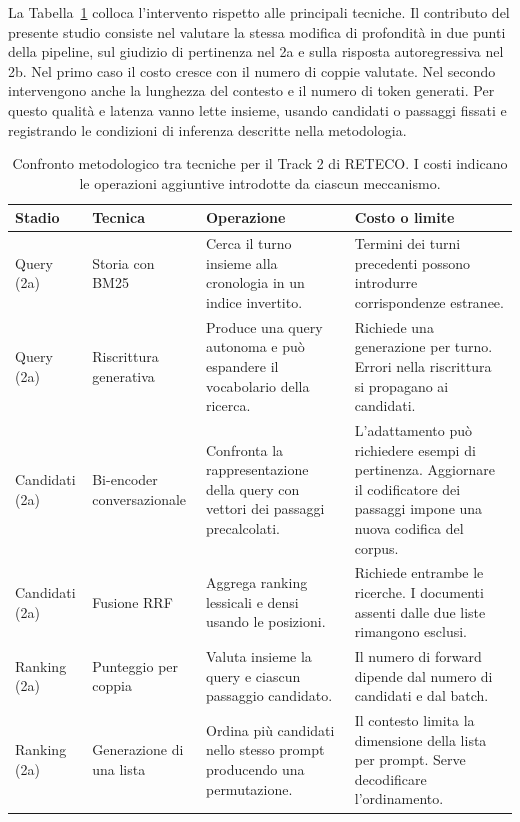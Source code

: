La Tabella~\ref{tab:related_techniques} colloca l'intervento rispetto alle principali tecniche. Il contributo del presente studio consiste nel valutare la stessa modifica di profondità in due punti della pipeline, sul giudizio di pertinenza nel 2a e sulla risposta autoregressiva nel 2b. Nel primo caso il costo cresce con il numero di coppie valutate. Nel secondo intervengono anche la lunghezza del contesto e il numero di token generati. Per questo qualità e latenza vanno lette insieme, usando candidati o passaggi fissati e registrando le condizioni di inferenza descritte nella metodologia.

\begin{table}[!htbp]
\centering
\small
\caption{Confronto metodologico tra tecniche per il Track 2 di RETECO. I costi indicano le operazioni aggiuntive introdotte da ciascun meccanismo.}
\label{tab:related_techniques}
\setlength{\tabcolsep}{4pt}
\renewcommand{\arraystretch}{1.24}
\begin{tabular}{@{}>{\raggedright\arraybackslash}p{.15\linewidth}>{\raggedright\arraybackslash}p{.21\linewidth}*{2}{>{\raggedright\arraybackslash}p{.28\linewidth}}@{}}
\toprule
\textbf{Stadio} & \textbf{Tecnica} & \textbf{Operazione} & \textbf{Costo o limite} \\
\midrule
Query (2a) & Storia con BM25 \cite{bm25,data} & Cerca il turno insieme alla cronologia in un indice invertito. & Termini dei turni precedenti possono introdurre corrispondenze estranee. \\
Query (2a) & Riscrittura generativa \cite{qrecc,convgqr,convsearchr1} & Produce una query autonoma e può espandere il vocabolario della ricerca. & Richiede una generazione per turno. Errori nella riscrittura si propagano ai candidati. \\
Candidati (2a) & Bi-encoder conversazionale \cite{convdr,haconvdr,qwen} & Confronta la rappresentazione della query con vettori dei passaggi precalcolati. & L'adattamento può richiedere esempi di pertinenza. Aggiornare il codificatore dei passaggi impone una nuova codifica del corpus. \\
Candidati (2a) & Fusione RRF \cite{rrf} & Aggrega ranking lessicali e densi usando le posizioni. & Richiede entrambe le ricerche. I documenti assenti dalle due liste rimangono esclusi. \\
Ranking (2a) & Punteggio per coppia \cite{qwen} & Valuta insieme la query e ciascun passaggio candidato. & Il numero di forward dipende dal numero di candidati e dal batch. \\
Ranking (2a) & Generazione di una lista \cite{rankgpt} & Ordina più candidati nello stesso prompt producendo una permutazione. & Il contesto limita la dimensione della lista per prompt. Serve decodificare l'ordinamento. \\

\end{tabular}
\end{table}

